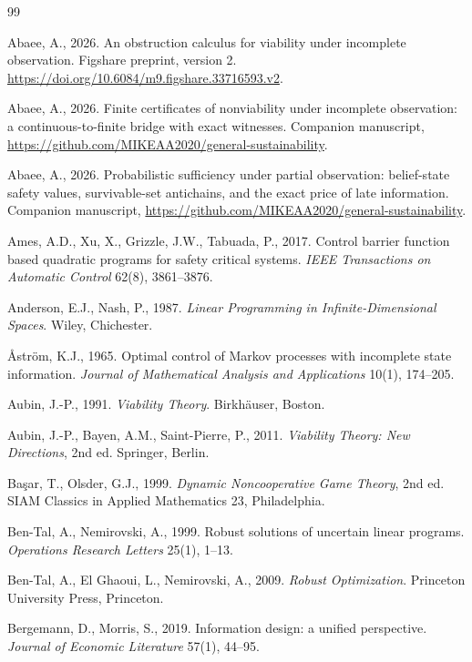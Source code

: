 \begin{thebibliography}{99}\footnotesize

 Abaee, A., 2026. An obstruction calculus for viability under incomplete observation. Figshare preprint, version 2. \url{https://doi.org/10.6084/m9.figshare.33716593.v2}.

 Abaee, A., 2026. Finite certificates of nonviability under incomplete observation: a continuous-to-finite bridge with exact witnesses. Companion manuscript, \url{https://github.com/MIKEAA2020/general-sustainability}.

 Abaee, A., 2026. Probabilistic sufficiency under partial observation: belief-state safety values, survivable-set antichains, and the exact price of late information. Companion manuscript, \url{https://github.com/MIKEAA2020/general-sustainability}.

 Ames, A.D., Xu, X., Grizzle, J.W., Tabuada, P., 2017. Control barrier function based quadratic programs for safety critical systems. \emph{IEEE Transactions on Automatic Control} 62(8), 3861--3876.

 Anderson, E.J., Nash, P., 1987. \emph{Linear Programming in Infinite-Dimensional Spaces}. Wiley, Chichester.

 \AA str\"om, K.J., 1965. Optimal control of Markov processes with incomplete state information. \emph{Journal of Mathematical Analysis and Applications} 10(1), 174--205.

 Aubin, J.-P., 1991. \emph{Viability Theory}. Birkh\"auser, Boston.

 Aubin, J.-P., Bayen, A.M., Saint-Pierre, P., 2011. \emph{Viability Theory: New Directions}, 2nd ed. Springer, Berlin.

 Ba\c{s}ar, T., Olsder, G.J., 1999. \emph{Dynamic Noncooperative Game Theory}, 2nd ed. SIAM Classics in Applied Mathematics 23, Philadelphia.

 Ben-Tal, A., Nemirovski, A., 1999. Robust solutions of uncertain linear programs. \emph{Operations Research Letters} 25(1), 1--13.

 Ben-Tal, A., El Ghaoui, L., Nemirovski, A., 2009. \emph{Robust Optimization}. Princeton University Press, Princeton.

 Bergemann, D., Morris, S., 2019. Information design: a unified perspective. \emph{Journal of Economic Literature} 57(1), 44--95.


\end{thebibliography}
